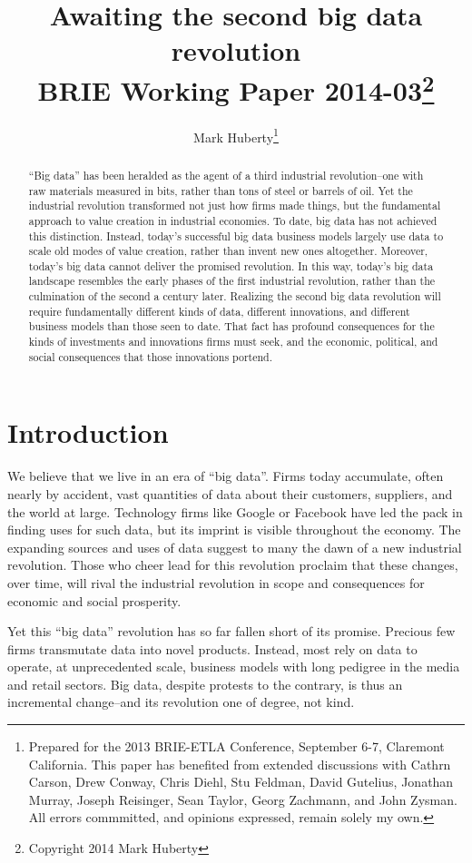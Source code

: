 \documentclass[12pt]{article}
\title{Awaiting the second big data revolution\\BRIE Working Paper
  2014-03\thanks{Copyright 2014 Mark Huberty}}
\author{Mark Huberty\thanks{Prepared for the 2013 BRIE-ETLA
    Conference, September 6-7, Claremont California. This paper has
    benefited from extended discussions with Cathrn Carson, Drew
    Conway, Chris Diehl, Stu Feldman, David
    Gutelius, Jonathan Murray, Joseph Reisinger, Sean Taylor, Georg Zachmann, and John
    Zysman. All errors commmitted, and opinions expressed, remain
    solely my own.}}
\begin{document}
\maketitle
\begin{abstract}
``Big data'' has been heralded as the agent of a third industrial
revolution--one with raw materials measured in bits, rather than tons
of steel or barrels of oil. Yet the industrial revolution transformed not just how
firms made things, but the fundamental approach to value creation in
industrial economies. To date, big data has not achieved this
distinction. Instead, today's successful big data business models
largely use data to scale old modes of value creation, rather than
invent new ones altogether. Moreover, today's big data cannot deliver
the promised revolution. In this way, today's big data landscape
resembles the early phases of the first industrial revolution, rather
than the culmination of the second a century later. Realizing the
second big data revolution will require fundamentally different kinds
of data, different innovations, and different business models than
those seen to date. That fact has profound consequences for the kinds
of investments and innovations firms must seek, and the economic,
political, and social consequences that those innovations portend.
\end{abstract}


\section{Introduction}
\label{sec:introduction}

We believe that we live in an era of ``big data''. Firms today
accumulate, often nearly by accident, vast quantities of data about
their customers, suppliers, and the world at large. Technology firms
like Google or Facebook have led the pack in finding uses for such
data, but its imprint is visible throughout the economy. The expanding
sources and uses of data suggest to many the dawn of a new industrial
revolution. Those who cheer lead for this revolution proclaim that
these changes, over time, will rival the industrial revolution in
scope and consequences for economic and social prosperity.

Yet this ``big data'' revolution has so far fallen short of its
promise. Precious few firms transmutate data into novel
products. Instead, most rely on data to operate, at unprecedented
scale, business models with long pedigree in the media and retail
sectors. Big data, despite protests to the contrary, is thus an
incremental change--and its revolution one of degree, not kind. 
\end{document}
